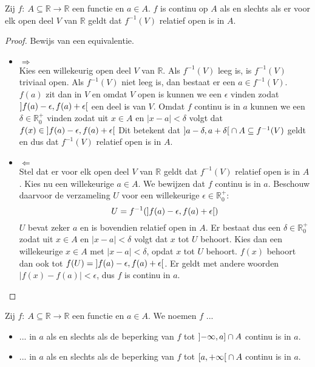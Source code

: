 \documentclass[main.tex]{subfiles}
\begin{document}
\begin{pr}
  Zij $f:\ A \subseteq \mathbb{R} \rightarrow \mathbb{R}$ een functie en $a\in A$.
  $f$ is continu op $A$ als en slechts als er voor elk open deel $V$ van $\mathbb{R}$ geldt dat $f^{-1}(V)$ relatief open is in $A$.
  \begin{proof}
    Bewijs van een equivalentie.
    \begin{itemize}
    \item $\Rightarrow$\\
      Kies een willekeurig open deel $V$ van $\mathbb{R}$.
      Als $f^{-1}(V)$ leeg is, is $f^{-1}(V)$ triviaal open.
      Als $f^{-1}(V)$ niet leeg is, dan bestaat er een $a\in f^{-1}(V)$.
      $f(a)$ zit dan in $V$ en omdat $V$ open is kunnen we een $\epsilon$ vinden zodat $\interval[open]{f(a)-\epsilon}{f(a)+\epsilon}$ een deel is van $V$.
      Omdat $f$ continu is in $a$ kunnen we een $\delta\in \mathbb{R}_{0}^{+}$ vinden zodat uit $x\in A$ en $|x-a| < \delta$ volgt dat $f(x) \in \interval[open]{f(a)-\epsilon}{f(a)+\epsilon}$
      Dit betekent dat $\interval[open]{a-\delta}{a+\delta} \cap A \subseteq f^{-1}(V)$ geldt en dus dat $f^{-1}(V)$ relatief open is in $A$.
    \item $\Leftarrow$\\
      Stel dat er voor elk open deel $V$ van $\mathbb{R}$ geldt dat $f^{-1}(V)$ relatief open is in $A$.
      Kies nu een willekeurige $a\in A$.
      We bewijzen dat $f$ continu is in $a$.
      Beschouw daarvoor de verzameling $U$ voor een willekeurige $\epsilon \in \mathbb{R}_{0}^{+}$:
      \[ U = f^{-1}(\interval[open]{f(a)-\epsilon}{f(a)+\epsilon}) \]
      $U$ bevat zeker $a$ en is bovendien relatief open in $A$.
      Er bestaat dus een $\delta \in \mathbb{R}_{0}^{+}$ zodat uit $x\in A$ en $|x-a|< \delta$ volgt dat $x$ tot $U$ behoort.
      Kies dan een willekeurige $x\in A$ met $|x-a|< \delta$, opdat $x$ tot $U$ behoort.
      $f(x)$ behoort dan ook tot $f(U) = \interval[open]{f(a)-\epsilon}{f(a)+\epsilon}$.
      Er geldt met andere woorden $|f(x)-f(a)|<\epsilon$, dus $f$ is continu in $a$.
    \end{itemize}
  \end{proof}
\end{pr}

\begin{de}
  Zij $f:\ A \subseteq \mathbb{R} \rightarrow \mathbb{R}$ een functie en $a\in A$.
  We noemen $f$ ...
  \begin{itemize}
  \item ... in $a$ als en slechts als de beperking van $f$ tot $\interval[open left]{-\infty}{a} \cap A$ continu is in $a$.
  \item ... in $a$ als en slechts als de beperking van $f$ tot $\interval[open right]{a}{+\infty} \cap A$ continu is in $a$.
  \end{itemize}
\end{de}
\end{document}
